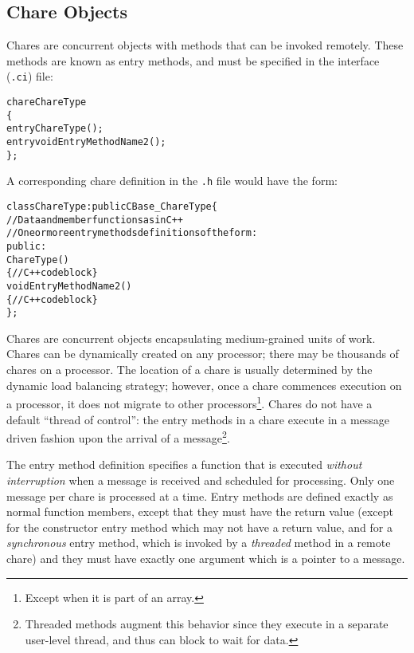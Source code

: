 \subsection{Chare Objects}

Chares are concurrent objects with methods that can be invoked
remotely.  These methods are known as entry methods, and 
must be specified in the interface (\texttt{.ci}) file:

\begin{alltt}
chare ChareType
\{
    entry   ChareType             ();
    entry   void EntryMethodName2 ();
\};
\end{alltt}

A corresponding chare definition in the \texttt{.h} file would 
have the form:

\begin{alltt}
   class ChareType : public CBase\_ChareType \{
        // Data and member functions as in C++ 
        // One or more entry methods definitions of the form: 
   public: 
      ChareType() 
         \{ // C++ code block  \} 
      void EntryMethodName2() 
         \{ // C++ code block  \} 
   \};
\end{alltt}

Chares are concurrent objects encapsulating medium-grained units of
work.  Chares can be dynamically created on any processor; there may
be thousands of chares on a processor. The location of a chare is
usually determined by the dynamic load balancing strategy; however,
once a chare commences execution on a processor, it does not migrate
to other processors\footnote{Except when it is part of an array.}.  
Chares do not have a default ``thread of
control'': the entry methods  in a
chare execute in a message driven fashion upon the arrival of a 
message\footnote{Threaded methods augment this behavior since they execute in
a separate user-level thread, and thus can block to wait for data.}.

The entry method definition specifies a function that is executed {\em
without interruption} when a message is received and scheduled for
processing. Only one message per chare is processed at a time.  Entry
methods are defined exactly as normal \CC{} function members, except
that they must have the return value  (except for the
constructor entry method which may not have a return value, and for a 
{\em synchronous} entry method, which is invoked by a {\em threaded} 
method in a remote chare) and they
must have exactly one argument which is a pointer to a message.

